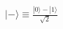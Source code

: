 \documentclass[preview]{standalone}
\begin{document}
\begin{align*}
|-\rangle  \equiv \frac{|0\rangle - |1\rangle}{\sqrt{2}}
\end{align*}
\end{document}
